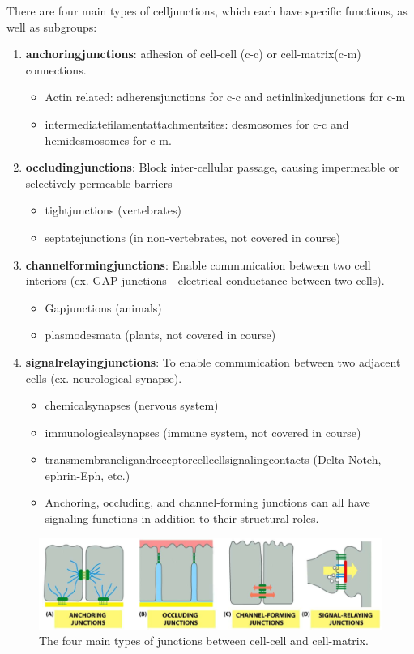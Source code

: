\documentclass[../main.tex]{subfiles}
\begin{document}
There are four main types of \gls{celljunctions}, which each have specific functions, as well as subgroups:
\begin{enumerate}
	\item \textbf{\gls{anchoringjunctions}}: adhesion of cell-cell (c-c) or cell-matrix(c-m) connections.
	\begin{itemize}
		\item Actin related: \gls{adherensjunctions} for c-c and \gls{actinlinkedjunctions} for c-m
		\item \gls{intermediatefilamentattachmentsites}: \gls{desmosomes} for c-c and \gls{hemidesmosomes} for c-m.
	\end{itemize}
	\item \textbf{\gls{occludingjunctions}}: Block inter-cellular passage, causing impermeable or selectively permeable barriers
	\begin{itemize}
		\item \gls{tightjunctions} (vertebrates)
		\item \gls{septatejunctions} (in non-vertebrates, not covered in course)
	\end{itemize}
	\item \textbf{\gls{channelformingjunctions}}: Enable communication between two cell interiors (ex. GAP junctions - electrical conductance between two cells).
	\begin{itemize}
		\item \gls{Gapjunctions} (animals)
		\item \gls{plasmodesmata} (plants, not covered in course)
	\end{itemize}
	\item \textbf{\gls{signalrelayingjunctions}}: To enable communication between two adjacent cells (ex. neurological synapse).
	\begin{itemize}
		\item \gls{chemicalsynapses} (nervous system)
		\item \gls{immunologicalsynapses} (immune system, not covered in course)
		\item \gls{transmembraneligandreceptorcellcellsignalingcontacts} (Delta-Notch, ephrin-Eph, etc.) 
		\item Anchoring, occluding, and channel-forming junctions can all have signaling functions in addition to their structural roles.
	\end{itemize}
\end{enumerate}

\begin{figure}[H]
	\centering
	\includegraphics[width=0.7\linewidth]{junct_types}
	\caption{The four main types of junctions between cell-cell and cell-matrix.}
	\label{fig:juncttypes}
\end{figure}
\end{document}
